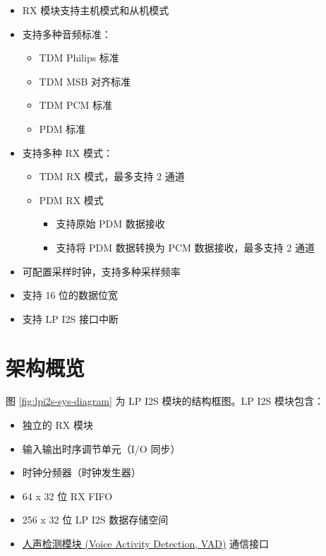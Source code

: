 \documentclass[main\_\_CN.tex]{subfiles}
\begin{document}
\begin{itemize}
    \item RX 模块支持主机模式和从机模式
    \item 支持多种音频标准：
        \begin{itemize}    
            \item TDM Philips 标准
            \item TDM MSB 对齐标准
            \item TDM PCM 标准
            \item PDM 标准
        \end{itemize}
    \item 支持多种 RX 模式：
        \begin{itemize}
            \item TDM RX 模式，最多支持 2 通道
            \item PDM RX 模式
            \begin{itemize}
                \item 支持原始 PDM 数据接收
                \item 支持将 PDM 数据转换为 PCM 数据接收，最多支持 2 通道
            \end{itemize}
        \end{itemize}
    \item 可配置采样时钟，支持多种采样频率
    \item 支持 16 位的数据位宽
    \item 支持 LP I2S 接口中断
\end{itemize}



\section{架构概览}
\label{sec:lpi2s-arch-overview}

图 \ref{fig:lpi2s-sys-diagram} 为 \chipname{} LP I2S 模块的结构框图。LP I2S 模块包含：

\begin{itemize}
    \item 独立的 RX 模块
    \item 输入输出时序调节单元（I/O 同步）
    \item 时钟分频器（时钟发生器）
    \item 64 x 32 位 RX FIFO
    \item 256 x 32 位 LP I2S 数据存储空间
    \item \hyperref[mod:vad]{人声检测模块 (Voice Activity Detection, VAD)} 通信接口
\end{itemize}
\end{document}

